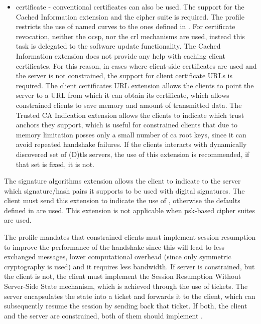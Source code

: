 \documentclass{llncs}
\begin{document}
\begin{itemize}
  \item certificate - conventional certificates can also be used. The support
  for the Cached Information extension\cite{RFC7924} and the 
  cipher suite is required. The profile restricts the use of named curves to
  the ones defined in \cite{RFC4492}. For certificate revocation, neither the
  \gls{ocsp}\cite{RFC6960}, nor the \gls{crl}\cite{RFCabc} mechanisms are used, instead this task is delegated to
  the software update functionality. The Cached Information extension does not
  provide any help with caching client certificates. For this reason, in cases
  where client-side certificates are used and the server is not constrained,
  the support for client certificate URLs is required. The client certificates URL
  extension\cite{RFC4366} allows the clients to point the server to a URL from
  which it can obtain its certificate, which allows constrained clients to
  save memory and amount of transmitted data. The Trusted CA Indication\cite{RFC6066}
  extension allows the clients to indicate which trust anchors they support, which is useful
  for constrained clients that due to memory limitation posses only a small number
  of \gls{ca} root keys, since it can avoid repeated handshake failures. If the clients interacts with
  dynamically discovered set of (D)\gls{tls} servers, the use of this extension is recommended,
  if that set is fixed, it is not.

\end{itemize}

The signature algorithms extension\cite{RFC5246} allows the client to indicate
to the server which signature/hash pairs it supports to be used with digital signatures.
The client must send this extension to indicate the use of ,
otherwise the defaults defined in \cite{RFC5246} are used. This extension is not
applicable when \gls{psk}-based cipher suites are used.

The profile mandates that constrained clients must implement session
resumption to improve the performance of the handshake since this will lead to
less exchanged messages, lower computational overhead (since only symmetric cryptography
is used) and it requires less bandwidth. If server is constrained, but
the client is not, the client must implement the Session Resumption Without
Server-Side State mechanism\cite{RFC5077}, which is achieved through the
use of tickets. The server encapsulates the state into a ticket and forwards it to
the client, which can subsequently resume the session by sending back that ticket.
If both, the client and the server are constrained, both of them should implement
\cite{RFC5077}.
\end{document}

